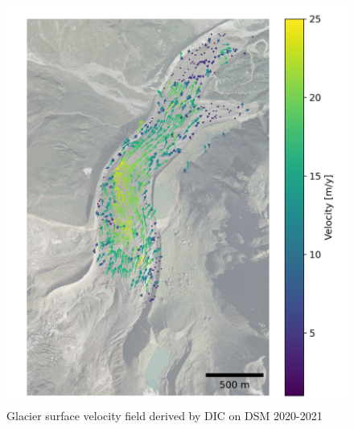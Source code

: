 \begin{figure}
    \centering
    \includegraphics[height=\textheight]{figures/chapter3/velocity_DIC_2020-2021.png}
    \caption[]{Glacier surface velocity field derived by DIC on DSM 2020-2021}
\end{figure}

